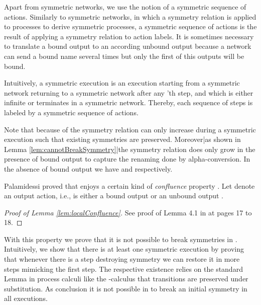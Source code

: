 \documentclass[11pt,techReport]{eptcs}
\begin{document}
Apart from symmetric networks, we use the notion of a symmetric sequence of actions. Similarly to symmetric networks, in which a symmetry relation is applied to processes to derive symmetric processes, a symmetric sequence of actions is the result of applying a symmetry relation to action labels. It is sometimes necessary to translate a bound output to an according unbound output because a network can send a bound name several times but only the first of this outputs will be bound.



Intuitively, a symmetric execution is an execution starting from a symmetric network returning to a symmetric network after any 'th step, and which is either infinite or terminates in a symmetric network. Thereby, each sequence of  steps is labeled by a symmetric sequence of actions. 


\noindent
Note that because of  the symmetry relation can only increase during a symmetric execution such that existing symmetries are preserved. Moreover|as shown in Lemma \ref{lem:cannotBreakSymmetry}|the symmetry relation does only grow in the presence of bound output to capture the renaming done by alpha-conversion. In the absence of bound output we have  and  respectively.

Palamidessi proved that \pisep enjoys a certain kind of \textit{confluence} property \cite{palamidessi03}. Let  denote an output action, i.e.,  is either a bound output  or an unbound output .
\begin{proof}[Proof of Lemma \ref{lem:localConfluence}]
	See proof of Lemma 4.1 in \cite{palamidessi03} at pages 17 to 18.
\end{proof}

With this property we prove that it is not possible to break symmetries in \pisep.  Intuitively, we show that there is at least one symmetric execution by proving that whenever there is a step destroying symmetry we can restore it in  more steps mimicking the first step. The respective existence relies on the standard Lemma in process calculi like the -calculus that transitions are preserved under substitution.  As conclusion it is not possible in \pisep to break an initial symmetry in all executions.
\end{document}
